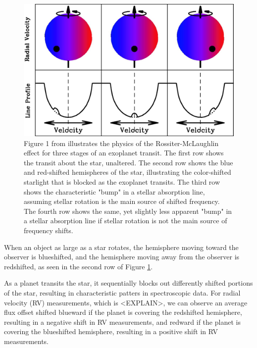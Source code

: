\documentclass[oneside,12pt]{amsart}
\numberwithin{page}{section}
\begin{document}
\begin{figure}[htbp]
    \centering
    \includegraphics[width=0.7\linewidth]{figs/gaudi_fig1.jpg}
    \caption{Figure 1 from \citep{gaudi2007prospects} illustrates the physics of the Rossiter-McLaughlin effect for three stages of an exoplanet transit. The first row shows the transit about the star, unaltered. The second row shows the blue and red-shifted hemispheres of the star, illustrating the color-shifted starlight that is blocked as the exoplanet transits. The third row shows the characteristic "bump" in a stellar absorption line, assuming stellar rotation is the main source of shifted frequency. The fourth row shows the same, yet slightly less apparent "bump" in a stellar absorption line if stellar rotation is not the main source of frequency shifts.}
    \label{fig:gaudi-fig1}
\end{figure}

When an object as large as a star rotates, the hemisphere moving toward the observer is blueshifted, and the hemisphere moving away from the observer is redshifted, as seen in the second row of Figure \ref{fig:gaudi-fig1}. 

As a planet transits the star, it sequentially blocks out differently shifted portions of the star, resulting in characteristic patters in spectroscopic data. For radial velocity (RV) measurements, which is <EXPLAIN>, we can observe an average flux offset shifted blueward if the planet is covering the redshifted hemisphere, resulting in a negative shift in RV measurements, and redward if the planet is covering the blueshifted hemisphere, resulting in a positive shift in RV measurements.
\end{document}
